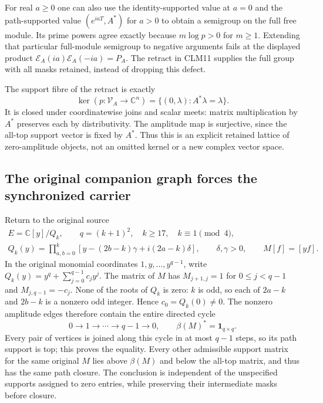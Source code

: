 \documentclass[11pt]{article}
\begin{document}
For real $a\ge0$ one can also use the identity-supported value at
$a=0$ and the path-supported value $(e^{iaT},A^*)$ for $a>0$ to obtain
a semigroup on the full free module. Its prime powers agree exactly
because $m\log p>0$ for $m\ge1$. Extending that particular full-module
semigroup to negative arguments fails at the displayed product
$\mathcal E_A(ia)\mathcal E_A(-ia)=P_A$. The retract in CLM11 supplies
the full group with all masks retained, instead of dropping this defect.

The support fibre of the retract is exactly
\begin{equation}\tag{CLM12}
\ker(p:\mathcal V_A\to\mathbb C^n)
 =\{(0,\lambda):A^*\lambda=\lambda\}.
\end{equation}
It is closed under coordinatewise joins and scalar meets: matrix
multiplication by $A^*$ preserves each by distributivity. The amplitude
map is surjective, since the all-top support vector is fixed by $A^*$.
Thus this is an explicit retained lattice of zero-amplitude objects,
not an omitted kernel or a new complex vector space.

\subsection{The original companion graph forces the synchronized carrier}

Return to the original source
\begin{equation}\tag{CLM13}
\begin{gathered}
E=\mathbb C[y]/Q_k,\qquad q=(k+1)^2,\quad k\ge17,
\quad k\equiv1\pmod4,\\
Q_k(y)=\prod_{a,b=0}^k
 [y-(2b-k)\gamma+i(2a-k)\delta],\qquad \delta,\gamma>0,\qquad
M[f]=[yf].
\end{gathered}
\end{equation}
In the original monomial coordinates $1,y,\ldots,y^{q-1}$, write
$Q_k(y)=y^q+\sum_{j=0}^{q-1}c_jy^j$. The matrix of $M$ has
$M_{j+1,j}=1$ for $0\le j<q-1$ and $M_{j,q-1}=-c_j$.
None of the roots of $Q_k$ is zero: $k$ is odd, so each of $2a-k$
and $2b-k$ is a nonzero odd integer. Hence $c_0=Q_k(0)\ne0$.
The nonzero amplitude edges therefore contain the entire directed
cycle
\begin{equation}\tag{CLM14}
0\longrightarrow1\longrightarrow\cdots\longrightarrow q-1
 \longrightarrow0,
\qquad \beta(M)^*=\mathbf 1_{q\times q}.
\end{equation}
Every pair of vertices is joined along this cycle in at most $q-1$
steps, so its path support is top; this proves the equality. Every
other admissible support matrix for the same original $M$ lies above
$\beta(M)$ and below the all-top matrix, and thus has the same path
closure. The conclusion is independent of the unspecified supports
assigned to zero entries, while preserving their intermediate masks
before closure.
\end{document}
